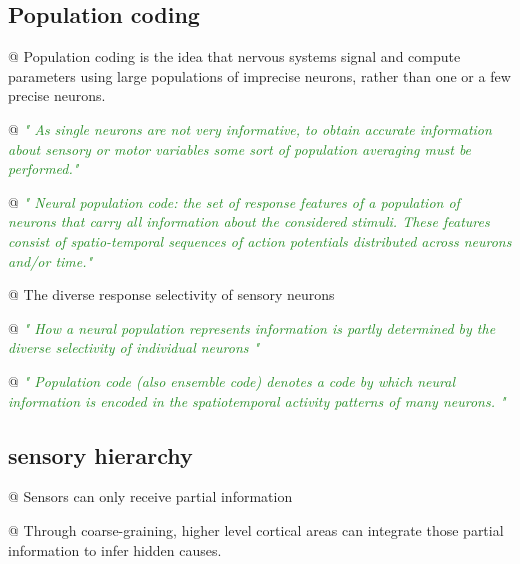 \documentclass[utf8]{article}
\newenvironment{ants}
			{
			 \begin{easylist}[itemize]
			}
			{
			\end{easylist}
			}
\newcommand{\rewrite}[1]{\textcolor{ForestGreen}{\textit{"#1"}}\newline}
\begin{document}
		
		
		\subsection{Population coding}
			\begin{ants}
				@ Population coding is the idea that nervous systems signal and compute parameters using large populations of imprecise neurons, rather than one or a few precise neurons. 
				
				@ \rewrite{
					As single neurons are not very informative, to obtain accurate information about sensory or motor variables some sort of population averaging must be performed.}
																					
			
				@ \rewrite{
					Neural population code: the set of response features of a population of neurons that carry all information about the considered stimuli. These features consist of spatio-temporal sequences of action potentials distributed across neurons and/or time.}
				
				@ The diverse response selectivity of sensory neurons
				
				@ \rewrite{
					How a neural population represents information is partly determined by the diverse selectivity of individual neurons \cite{Shamir2014}}
				
				@ \rewrite{
					Population code (also ensemble code) denotes a code by which neural information is encoded in the spatiotemporal activity patterns of many neurons.
					} \cite{binder2009encyclopedia}
				
			\end{ants}
			
			
		
		
		\subsection{sensory hierarchy}
		
			\begin{ants}
				@ Sensors can only receive partial information
				
				@ Through coarse-graining, higher level cortical areas can integrate those partial information to infer hidden causes. 
		
			\end{ants}
		
\end{document}
